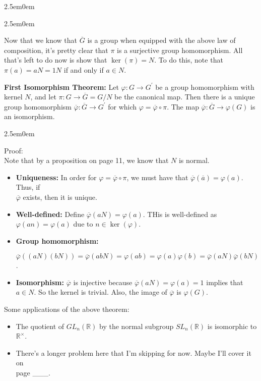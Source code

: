 \documentclass{book}
\newcommand{\hThree}{%
   \color{PineGreen!85!Orange}
   \fontsize{12}{14}\selectfont%
}
\newcommand{\exOne}{%
   \color{Purple}%
   \fontsize{13}{15}\selectfont%
}
\newenvironment{myIndent}{%
   \begin{adjustwidth}{2.5em}{0em}%
}{%
   \end{adjustwidth}%
}
\newcommand{\blab}[1]{\textbf{#1}}
\newcommand{\retTwo}{\hfill\bigbreak}
\begin{document}
\begin{myIndent}
\begin{myIndent}
		Now that we know that $\overline{G}$ is a group when equipped with the above law of\\ composition, it's pretty clear that $\pi$ is a surjective group homomorphism. All that's left to do now is show that $\ker(\pi) = N$. To do this, note that $\pi(a) = aN = 1N$ if and only if $a \in N$.\newpage
	\end{myIndent}

	\blab{First Isomorphism Theorem:} Let $\varphi: G \longrightarrow G^\prime$ be a group homomorphism with kernel $N$, and let $\pi: G \longrightarrow \overline{G} = G / N$ be the canonical map. Then there is a unique group homomorphism $\overline{\varphi}: \overline{G} \longrightarrow G^\prime$ for which $\varphi = \overline{\varphi} \circ \pi$. The map $\overline{\varphi}: \overline{G} \longrightarrow \varphi(G)$ is an isomorphism.

	\begin{myIndent}\hThree
		Proof:\\
		Note that by a proposition on page 11, we know that $N$ is normal.\retTwo
		\begin{itemize}
			\item \blab{Uniqueness:} In order for $\varphi = \overline{\varphi} \circ \pi$, we must have that $\overline{\varphi}(\overline{a}) = \varphi(a)$. Thus, if\\ $\overline{\varphi}$ exists, then it is unique.
			\item \blab{Well-defined:} Define $\overline{\varphi}(aN) = \varphi(a)$. THis is well-defined as $\varphi(an) = \varphi(a)$ due to $n \in \ker(\varphi)$.
			\item \blab{Group homomorphism:}
			
			{\centering$\overline{\varphi}((aN)(bN)) = \overline{\varphi}(abN) = \varphi(ab) = \varphi(a)\varphi(b) = \overline{\varphi}(aN)\overline{\varphi}(bN)$.\par}

			\item \blab{Isomorphism:} $\overline{\varphi}$ is injective because $\overline{\varphi}(aN) = \varphi(a) = 1$ implies that $a \in N$. So the kernel is trivial. Also, the image of $\overline{\varphi}$ is $\varphi(G)$.\retTwo
		\end{itemize}
	\end{myIndent}
\end{myIndent}

\exOne
Some applications of the above theorem:

\begin{itemize}
	\item The quotient of $GL_n(\mathbb{R})$ by the normal subgroup $SL_n(\mathbb{R})$ is isomorphic to $\mathbb{R}^\times$.
	
	\item There's a longer problem here that I'm skipping for now. Maybe I'll cover it on\\ page \_\_\_.
\end{itemize}
\end{document}
